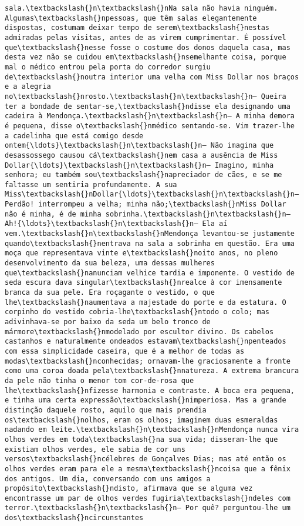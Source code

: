 \begin{Verbatim}[commandchars=\\\{\}]
sala.\textbackslash{}n\textbackslash{}nNa sala não havia ninguém. Algumas\textbackslash{}npessoas, que têm salas elegantemente dispostas, costumam deixar tempo de serem\textbackslash{}nestas admiradas pelas visitas, antes de as virem cumprimentar. É possível que\textbackslash{}nesse fosse o costume dos donos daquela casa, mas desta vez não se cuidou em\textbackslash{}nsemelhante coisa, porque mal o médico entrou pela porta do corredor surgiu de\textbackslash{}noutra interior uma velha com Miss Dollar nos braços e a alegria no\textbackslash{}nrosto.\textbackslash{}n\textbackslash{}n— Queira ter a bondade de sentar-se,\textbackslash{}ndisse ela designando uma cadeira à Mendonça.\textbackslash{}n\textbackslash{}n— A minha demora é pequena, disse o\textbackslash{}nmédico sentando-se. Vim trazer-lhe a cadelinha que está comigo desde ontem{\ldots}\textbackslash{}n\textbackslash{}n— Não imagina que desassossego causou cá\textbackslash{}nem casa a ausência de Miss Dollar{\ldots}\textbackslash{}n\textbackslash{}n— Imagino, minha senhora; eu também sou\textbackslash{}napreciador de cães, e se me faltasse um sentiria profundamente. A sua Miss\textbackslash{}nDollar{\ldots}\textbackslash{}n\textbackslash{}n— Perdão! interrompeu a velha; minha não;\textbackslash{}nMiss Dollar não é minha, é de minha sobrinha.\textbackslash{}n\textbackslash{}n— Ah!{\ldots}\textbackslash{}n\textbackslash{}n— Ela aí vem.\textbackslash{}n\textbackslash{}nMendonça levantou-se justamente quando\textbackslash{}nentrava na sala a sobrinha em questão. Era uma moça que representava vinte e\textbackslash{}noito anos, no pleno desenvolvimento da sua beleza, uma dessas mulheres que\textbackslash{}nanunciam velhice tardia e imponente. O vestido de seda escura dava singular\textbackslash{}nrealce à cor imensamente branca da sua pele. Era roçagante o vestido, o que lhe\textbackslash{}naumentava a majestade do porte e da estatura. O corpinho do vestido cobria-lhe\textbackslash{}ntodo o colo; mas adivinhava-se por baixo da seda um belo tronco de mármore\textbackslash{}nmodelado por escultor divino. Os cabelos castanhos e naturalmente ondeados estavam\textbackslash{}npenteados com essa simplicidade caseira, que é a melhor de todas as modas\textbackslash{}nconhecidas; ornavam-lhe graciosamente a fronte como uma coroa doada pela\textbackslash{}nnatureza. A extrema brancura da pele não tinha o menor tom cor-de-rosa que lhe\textbackslash{}nfizesse harmonia e contraste. A boca era pequena, e tinha uma certa expressão\textbackslash{}nimperiosa. Mas a grande distinção daquele rosto, aquilo que mais prendia os\textbackslash{}nolhos, eram os olhos; imaginem duas esmeraldas nadando em leite.\textbackslash{}n\textbackslash{}nMendonça nunca vira olhos verdes em toda\textbackslash{}na sua vida; disseram-lhe que existiam olhos verdes, ele sabia de cor uns versos\textbackslash{}ncélebres de Gonçalves Dias; mas até então os olhos verdes eram para ele a mesma\textbackslash{}ncoisa que a fênix dos antigos. Um dia, conversando com uns amigos a propósito\textbackslash{}ndisto, afirmava que se alguma vez encontrasse um par de olhos verdes fugiria\textbackslash{}ndeles com terror.\textbackslash{}n\textbackslash{}n— Por quê? perguntou-lhe um dos\textbackslash{}ncircunstantes 
\end{Verbatim}
